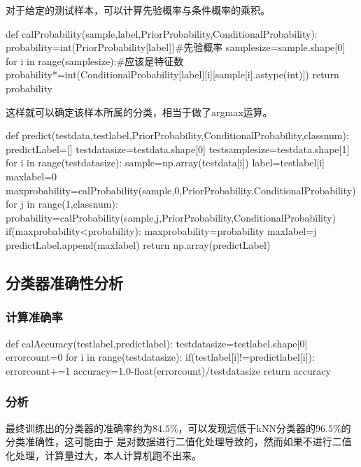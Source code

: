 对于给定的测试样本，可以计算先验概率与条件概率的乘积。
\begin{python}
  def calProbability(sample,label,PriorProbability,ConditionalProbability):
    probability=int(PriorProbability[label])#先验概率
    samplesize=sample.shape[0]
    for i in range(samplesize):#应该是特征数
        probability*=int(ConditionalProbability[label][i][sample[i].astype(int)])
    return probability
\end{python}

这样就可以确定该样本所属的分类，相当于做了argmax运算。
\begin{python}
  def predict(testdata,testlabel,PriorProbability,ConditionalProbability,classnum):
    predictLabel=[]
    testdatasize=testdata.shape[0]
    testsamplesize=testdata.shape[1]
    for i in range(testdatasize):
        sample=np.array(testdata[i])
        label=testlabel[i]
        maxlabel=0
        maxprobability=calProbability(sample,0,PriorProbability,ConditionalProbability)
        for j in range(1,classnum):
            probability=calProbability(sample,j,PriorProbability,ConditionalProbability)
            if(maxprobability<probability):
                maxprobability=probability
                maxlabel=j
        predictLabel.append(maxlabel)
    return np.array(predictLabel)
\end{python}

\subsection{分类器准确性分析}
\subsubsection{计算准确率}
\begin{python}
  def calAccuracy(testlabel,predictlabel):
    testdatasize=testlabel.shape[0]
    errorcount=0
    for i in range(testdatasize):
        if(testlabel[i]!=predictlabel[i]):
            errorcount+=1
    accuracy=1.0-float(errorcount)/testdatasize
    return accuracy
\end{python}
\subsubsection{分析}
最终训练出的分类器的准确率约为$84.5\%$，可以发现远低于kNN分类器的$96.5\%$的分类准确性，这可能由于
是对数据进行二值化处理导致的，然而如果不进行二值化处理，计算量过大，本人计算机跑不出来。

